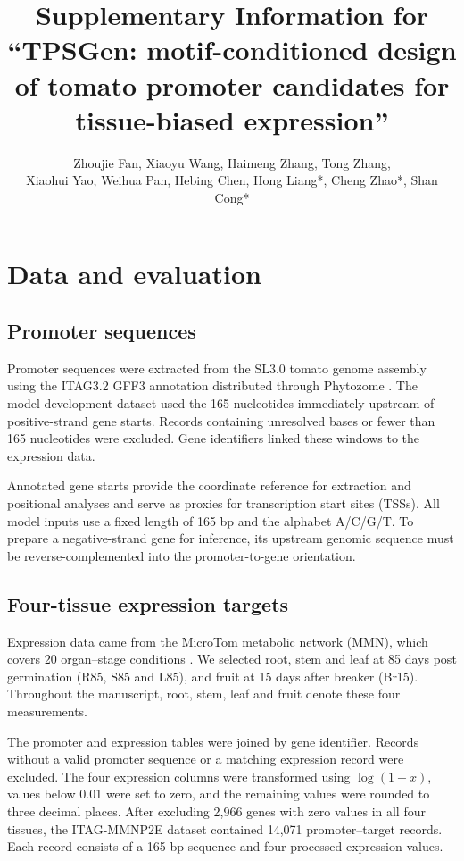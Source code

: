 \documentclass[10pt]{article}
\title{Supplementary Information for\\ ``TPSGen: motif-conditioned design of tomato promoter candidates for tissue-biased expression''}
\author{\normalsize Zhoujie Fan, Xiaoyu Wang, Haimeng Zhang, Tong Zhang,\\
\normalsize Xiaohui Yao, Weihua Pan, Hebing Chen, Hong Liang*, Cheng Zhao*, Shan Cong*}
\date{}
\begin{document}
\maketitle

\section{Data and evaluation}

\subsection{Promoter sequences}

Promoter sequences were extracted from the SL3.0 tomato genome assembly using the ITAG3.2 GFF3 annotation distributed through Phytozome \cite{Goodstein2012,Sato2012}. The model-development dataset used the 165 nucleotides immediately upstream of positive-strand gene starts. Records containing unresolved bases or fewer than 165 nucleotides were excluded. Gene identifiers linked these windows to the expression data.

Annotated gene starts provide the coordinate reference for extraction and positional analyses and serve as proxies for transcription start sites (TSSs). All model inputs use a fixed length of 165 bp and the alphabet A/C/G/T. To prepare a negative-strand gene for inference, its upstream genomic sequence must be reverse-complemented into the promoter-to-gene orientation.

\subsection{Four-tissue expression targets}

Expression data came from the MicroTom metabolic network (MMN), which covers 20 organ--stage conditions \cite{Li2020}. We selected root, stem and leaf at 85 days post germination (R85, S85 and L85), and fruit at 15 days after breaker (Br15). Throughout the manuscript, root, stem, leaf and fruit denote these four measurements.

The promoter and expression tables were joined by gene identifier. Records without a valid promoter sequence or a matching expression record were excluded. The four expression columns were transformed using $\log(1+x)$, values below 0.01 were set to zero, and the remaining values were rounded to three decimal places. After excluding 2,966 genes with zero values in all four tissues, the ITAG-MMNP2E dataset contained 14,071 promoter--target records. Each record consists of a 165-bp sequence and four processed expression values.
\end{document}
